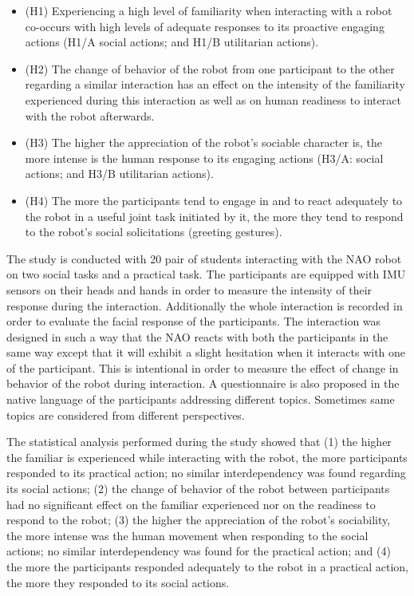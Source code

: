 \begin{itemize}
\item (H1) Experiencing a high level of familiarity when interacting with a robot co-occurs with high levels of adequate responses to its proactive engaging actions (H1/A social actions; and H1/B utilitarian actions).
\item (H2) The change of behavior of the robot from one participant to the other regarding a similar interaction has an effect on the intensity of the familiarity experienced during this interaction as well as on human readiness to interact with the robot afterwards.
\item (H3) The higher the appreciation of the robot’s sociable character is, the more intense is the human response to its engaging actions (H3/A: social actions; and H3/B utilitarian actions).
\item (H4) The more the participants tend to engage in and to react adequately to the robot in a useful joint task initiated by it, the more they tend to respond to the robot’s social solicitations (greeting gestures).
\end{itemize}

The study is conducted with 20 pair of students interacting with the NAO robot on two social tasks and a practical task. The participants are equipped with IMU sensors on their heads and hands in order to measure the intensity of their response during the interaction. Additionally the whole interaction is recorded in order to evaluate the facial response of the participants. The interaction was designed in such a way that the NAO reacts with both the participants in the same way except that it will exhibit a slight hesitation when it interacts with one of the participant. This is intentional in order to measure the effect of change in behavior of the robot during interaction. A questionnaire is also proposed in the native language of the participants addressing different topics. Sometimes same topics are considered from different perspectives. 

The statistical analysis performed during the study showed that (1) the higher the familiar is experienced while interacting with the robot, the more participants responded to its practical action; no similar interdependency was found regarding its social actions; (2) the change of behavior of the robot between participants had no significant effect on the familiar experienced nor on the readiness to respond to the robot; (3) the higher the appreciation of the robot’s sociability, the more intense was the human movement when responding to the social actions; no similar interdependency was found for the practical action; and (4) the more the participants responded adequately to the robot in a practical action, the more they responded to its social actions.


